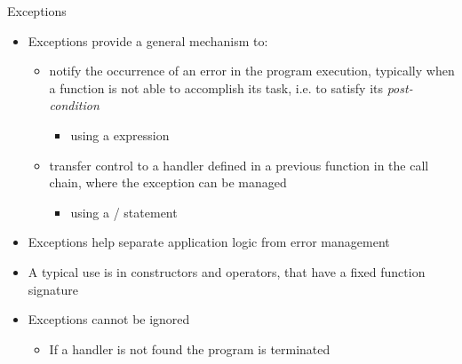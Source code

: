 \begin{frame}[fragile]{Exceptions}

  \begin{itemize}
  \item Exceptions provide a general mechanism to:
    \begin{itemize}
    \item notify the occurrence of an error in the program execution, typically
      when a function is not able to accomplish its task, i.e. to satisfy its
      \textit{post-condition}
      \begin{itemize}
      \item using a  expression
      \end{itemize}
    \item transfer control to a handler defined in a previous function in the call
      chain, where the exception can be managed
      \begin{itemize}
      \item using a / statement
      \end{itemize}
    \end{itemize}
  \item<2-> Exceptions help separate application logic from error management
  \item<3-> A typical use is in constructors and operators, that have a fixed
    function signature
  \item<4-> Exceptions cannot be ignored
    \begin{itemize}
    \item If a handler is not found the program is terminated
    \end{itemize}
  \end{itemize}

\end{frame}

